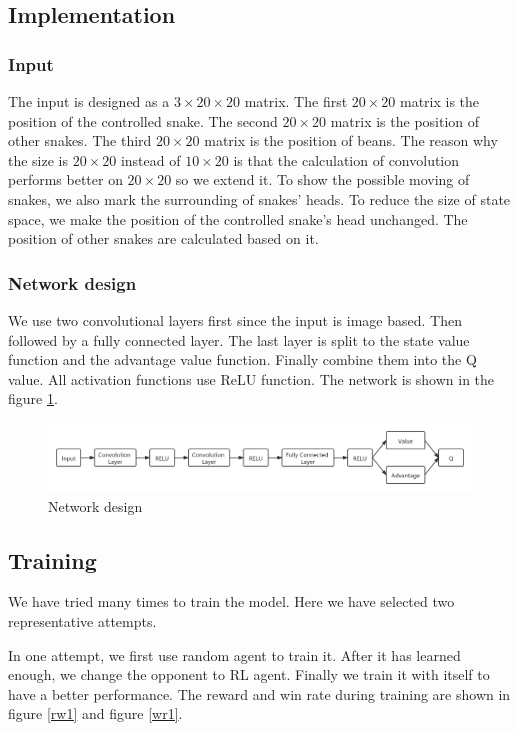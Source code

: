 \documentclass{article}
\begin{document}
\subsection{Implementation}

\subsubsection{Input}
The input is designed as a $3\times 20 \times 20$ matrix. The first $20\times 20$ matrix is the position of the controlled snake. The second $20 \times 20$ matrix is the position of other snakes. The third $20 \times 20$ matrix is the position of beans. The reason why the size is $20\times 20$ instead of $10\times 20$ is that the calculation of convolution performs better on $20\times 20$ so we extend it. To show the possible moving of snakes, we also mark the surrounding of snakes' heads. To reduce the size of state space, we make the position of the controlled snake's head unchanged. The position of other snakes are calculated based on it.

\subsubsection{Network design}
We use two convolutional layers first since the input is image based. Then followed by a fully connected layer. The last layer is split to the state value function and the advantage value function. Finally combine them into the Q value. All activation functions use ReLU function. The network is shown in the figure \ref{network}.

\begin{figure}[h]
  \centering
  \includegraphics[width=1\textwidth]{figs/network.png}
  \caption{Network design}
  \label{network}
\end{figure}

\subsection{Training}

We have tried many times to train the model. Here we have selected two representative attempts.

In one attempt, we first use random agent to train it. After it has learned enough, we change the opponent to RL agent. Finally we train it with itself to have a better performance. The reward and win rate during training are shown in figure \ref{rw1} and figure \ref{wr1}.
\end{document}
